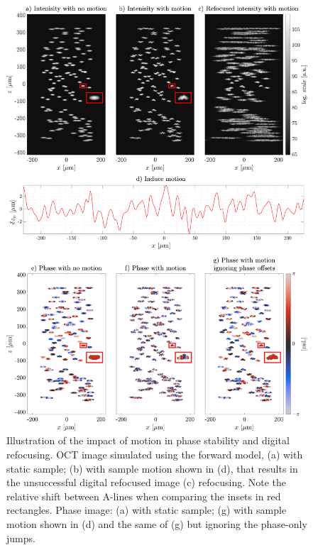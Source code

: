 \begin{figure}[]
	\centering
	\includegraphics[width=.95\textwidth]{Figures/TheoreticalBasis/MotionEx.pdf}
	\caption{Illustration of the impact of motion in phase stability and digital refocusing. OCT image simulated using the forward model, (a) with static sample; (b) with sample motion shown in (d), that results in the unsuccessful digital refocused image (c) refocusing. Note the relative shift between A-lines when comparing the insets in red rectangles. Phase image: (a) with static sample; (g) with sample motion shown in (d) and the same of (g) but ignoring the phase-only jumps.}
	\label{fig:motionEx}
\end{figure}

